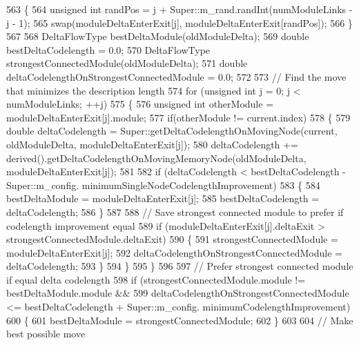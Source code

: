 \begin{DoxyCode}
563         \{
564             \textcolor{keywordtype}{unsigned} \textcolor{keywordtype}{int} randPos = j + Super::m\_rand.randInt(numModuleLinks - j - 1);
565             swap(moduleDeltaEnterExit[j], moduleDeltaEnterExit[randPos]);
566         \}
567 
568         DeltaFlowType bestDeltaModule(oldModuleDelta);
569         \textcolor{keywordtype}{double} bestDeltaCodelength = 0.0;
570         DeltaFlowType strongestConnectedModule(oldModuleDelta);
571         \textcolor{keywordtype}{double} deltaCodelengthOnStrongestConnectedModule = 0.0;
572 
573         \textcolor{comment}{// Find the move that minimizes the description length}
574         \textcolor{keywordflow}{for} (\textcolor{keywordtype}{unsigned} \textcolor{keywordtype}{int} j = 0; j < numModuleLinks; ++j)
575         \{
576             \textcolor{keywordtype}{unsigned} \textcolor{keywordtype}{int} otherModule = moduleDeltaEnterExit[j].module;
577             \textcolor{keywordflow}{if}(otherModule != current.index)
578             \{
579                 \textcolor{keywordtype}{double} deltaCodelength = Super::getDeltaCodelengthOnMovingNode(current, oldModuleDelta, 
      moduleDeltaEnterExit[j]);
580                 deltaCodelength += derived().getDeltaCodelengthOnMovingMemoryNode(oldModuleDelta, 
      moduleDeltaEnterExit[j]);
581 
582                 \textcolor{keywordflow}{if} (deltaCodelength < bestDeltaCodelength - Super::m\_config.
      minimumSingleNodeCodelengthImprovement)
583                 \{
584                     bestDeltaModule = moduleDeltaEnterExit[j];
585                     bestDeltaCodelength = deltaCodelength;
586                 \}
587 
588                 \textcolor{comment}{// Save strongest connected module to prefer if codelength improvement equal}
589                 \textcolor{keywordflow}{if} (moduleDeltaEnterExit[j].deltaExit > strongestConnectedModule.deltaExit)
590                 \{
591                     strongestConnectedModule = moduleDeltaEnterExit[j];
592                     deltaCodelengthOnStrongestConnectedModule = deltaCodelength;
593                 \}
594             \}
595         \}
596 
597         \textcolor{comment}{// Prefer strongest connected module if equal delta codelength}
598         \textcolor{keywordflow}{if} (strongestConnectedModule.module != bestDeltaModule.module &&
599                 deltaCodelengthOnStrongestConnectedModule <= bestDeltaCodelength + Super::m\_config.
      minimumCodelengthImprovement)
600         \{
601             bestDeltaModule = strongestConnectedModule;
602         \}
603 
604         \textcolor{comment}{// Make best possible move}

\end{DoxyCode}
